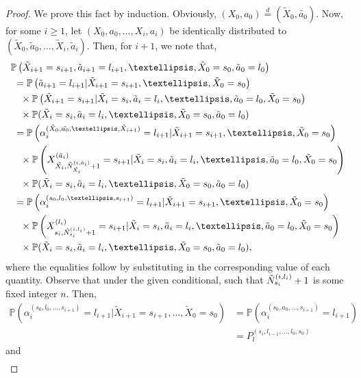 \documentclass[10pt,a4paper]{amsart}
\newcommand{\Pbb}{\mathbb{P}}
\newcommand{\lp}{\left(}
\newcommand{\pow}[1]{^{(#1)}}%
\newcommand{\prob}{\Pbb}
\newcommand{\rp}{\right)}
\begin{document}
\begin{proof}
We prove this fact by induction. 
Obviously, $(X_0,a_0)\overset{d}{=}(\tilde X_0,\tilde{a_0})$.
Now, for some $i\geq 1$, let $\lp X_0,a_0,\dots,X_i,a_i\rp$ be identically distributed to $\lp \tilde X_0,\tilde a_0,\dots,\tilde X_i,\tilde a_i\rp$. Then, for $i+1$, we note that,
\begin{align*}
    & \prob\lp \tilde X_{i+1}=s_{i+1},\tilde a_{i+1}=l_{i+1},\dots,\tilde X_0=s_0,\tilde a_0=l_0 \rp\\
    & \ =\prob\lp \tilde a_{i+1}=l_{i+1}| \tilde X_{i+1}=s_{i+1},\dots,\tilde X_0=s_0\rp\\ 
    &\quad \times\prob\lp \tilde X_{i+1}=s_{i+1}|\tilde X_i=s_i,\tilde a_{i}=l_i,\dots,\tilde a_0=l_0,\tilde X_0=s_0\rp\\
    &\quad \times \prob(\tilde X_i=s_i,\tilde a_i=l_i,\dots,\tilde X_0=s_0,\tilde a_0=l_0)\\
    & \ =\prob\lp  \alpha_i\pow{\tilde X_0,\tilde{a_0},\dots,\tilde X_{i+1}}=l_{i+1}| \tilde X_{i+1}=s_{i+1},\dots,\tilde X_0=s_0\rp\\
    &\quad \times \prob\lp X_{\Tilde{X_i},\Tilde{N}_{\Tilde{X_i}}^{(i,\tilde a_i)}+1}\pow{\tilde a_i}=s_{i+1}|\tilde X_i=s_i,\tilde a_{i}=l_i,\dots,\tilde a_0=l_0,\tilde X_0=s_0\rp\\
    &\quad \times \prob(\tilde X_i=s_i,\tilde a_i=l_i,\dots,\tilde X_0=s_0,\tilde a_0=l_0)\\
    & \ =\prob\lp  \alpha_i\pow{s_0,l_0,\dots,s_{i+1}}=l_{i+1}| \tilde X_{i+1}=s_{i+1},\dots,\tilde X_0=s_0\rp\\
    &\quad \times \prob\lp X_{s_i,\Tilde{N}_{s_i}^{(i,l_i)}+1}\pow{l_i}=s_{i+1}|\tilde X_i=s_i,\tilde a_{i}=l_i,\dots,\tilde a_0=l_0,\tilde X_0=s_0\rp\\
    &\quad \times \prob(\tilde X_i=s_i,\tilde a_i=l_i,\dots,\tilde X_0=s_0,\tilde a_0=l_0),
\end{align*}
where the equalities follow by substituting in the corresponding value of each quantity. Observe that under the given conditional, such that $\Tilde{N}_{s_i}^{(i,l_i)}+1$ is some fixed integer $n$. 
Then,
\begin{align*}
    \prob\lp  \alpha_i\pow{s_0,l_0,\dots,s_{i+1}}=l_{i+1}| \tilde X_{i+1}=s_{i+1},\dots,\tilde X_0=s_0\rp & = \prob\lp \alpha_i\pow{s_0,a_0,\dots,s_{i+1}}=l_{i+1}\rp\\
    & =  P_l\pow{s_i,l_{i-1},\dots,l_0,s_0} 
\end{align*}
and
\begin{align*}

\end{align*}
\end{proof}
\end{document}
